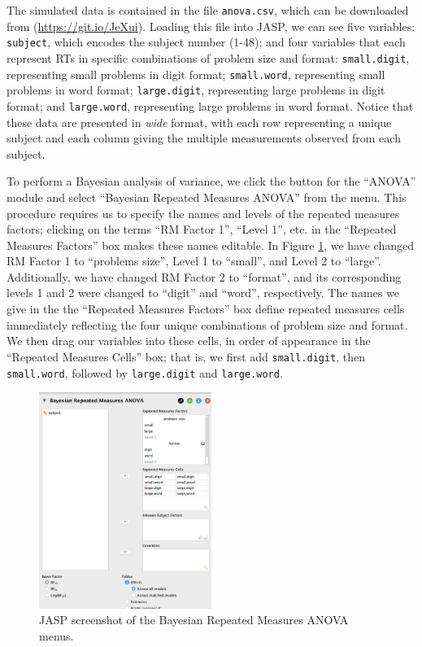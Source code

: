 \documentclass[english,,doc,floatsintext]{apa6}
\begin{document}
The simulated data is contained in the file \texttt{anova.csv}, which can be downloaded from (\url{https://git.io/JeXui}). Loading this file into JASP, we can see five variables: \texttt{subject}, which encodes the subject number (1-48); and four variables that each represent RTs in specific combinations of problem size and format: \texttt{small.digit}, representing small problems in digit format; \texttt{small.word}, representing small problems in word format; \texttt{large.digit}, representing large problems in digit format; and \texttt{large.word}, representing large problems in word format. Notice that these data are presented in \emph{wide} format, with each row representing a unique subject and each column giving the multiple measurements observed from each subject.

To perform a Bayesian analysis of variance, we click the button for the \enquote{ANOVA} module and select \enquote{Bayesian Repeated Measures ANOVA} from the menu. This procedure requires us to specify the names and levels of the repeated measures factors; clicking on the terms \enquote{RM Factor 1}, \enquote{Level 1}, etc. in the \enquote{Repeated Measures Factors} box makes these names editable. In Figure \ref{fig:repeatedMeasures1}, we have changed RM Factor 1 to \enquote{problems size}, Level 1 to \enquote{small}, and Level 2 to \enquote{large}. Additionally, we have changed RM Factor 2 to \enquote{format}, and its corresponding levels 1 and 2 were changed to \enquote{digit} and \enquote{word}, respectively. The names we give in the the \enquote{Repeated Measures Factors} box define repeated measures cells immediately reflecting the four unique combinations of problem size and format. We then drag our variables into these cells, in order of appearance in the \enquote{Repeated Measures Cells} box; that is, we first add \texttt{small.digit}, then \texttt{small.word}, followed by \texttt{large.digit} and \texttt{large.word}.

\begin{figure}[htbp]
\centering
\includegraphics[width=0.5\textwidth,height=\textheight]{figures/repeatedMeasures1.png}
\caption{\label{fig:repeatedMeasures1}JASP screenshot of the Bayesian Repeated Measures ANOVA menus.}
\end{figure}
\end{document}
